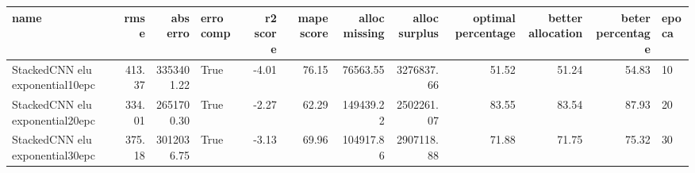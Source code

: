 \begin{tabular}{lrrlrrrrrrrl}
\toprule
name & rmse & abs erro & erro comp & r2 score & mape score & alloc missing & alloc surplus & optimal percentage & better allocation & beter percentage & epoca \\
\midrule
StackedCNN elu exponential10epc & 413.37 & 3353401.22 & True & -4.01 & 76.15 & 76563.55 & 3276837.66 & 51.52 & 51.24 & 54.83 & 10 \\
StackedCNN elu exponential20epc & 334.01 & 2651700.30 & True & -2.27 & 62.29 & 149439.22 & 2502261.07 & 83.55 & 83.54 & 87.93 & 20 \\
StackedCNN elu exponential30epc & 375.18 & 3012036.75 & True & -3.13 & 69.96 & 104917.86 & 2907118.88 & 71.88 & 71.75 & 75.32 & 30 \\
\bottomrule
\end{tabular}
